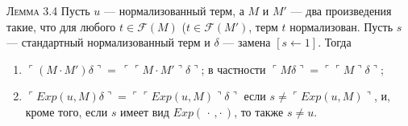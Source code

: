 
\textsc{Лемма 3.4}
Пусть $u$ — нормализованный терм, а $M$ и $M'$ — два произведения такие,
что для любого $t\in\mathcal F(M)$ ($t\in\mathcal F(M')$, терм $t$ нормализован.
Пусть $s$ — стандартный нормализованный терм и
$\delta$ — замена $[s \leftarrow 1]$. Тогда
\begin{enumerate}
\item $\ulcorner(M\!\cdot\!M')\delta\urcorner= \,\ulcorner\ulcorner M\cdot M'\urcorner\delta\urcorner$; в частности
      $\ulcorner M\delta\urcorner = \ulcorner\ulcorner M\urcorner\delta\urcorner$;
\item $\ulcorner Exp(u,M)\delta\urcorner=
      \ulcorner\ulcorner Exp(u,M)\urcorner\delta\urcorner$
      если $s\neq\ulcorner Exp(u,M)\urcorner$, и, кроме того,
      если $s$ имеет вид $ Exp(\,\cdot\,,\cdot\,)$,
      то также $s\neq u$.
\end{enumerate}

